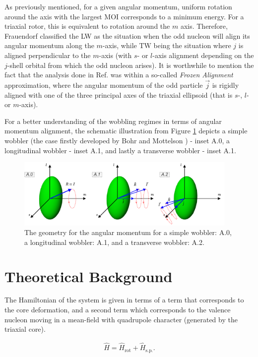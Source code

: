\documentclass[11pt]{article}
\begin{document}
As previously mentioned, for a given angular momentum, uniform rotation around the axis with the largest MOI corresponds to a minimum energy. For a triaxial rotor, this is equivalent to rotation around the $m$ axis. Therefore, Frauendorf \cite{frauendorf2014transverse} classified the LW as the situation when the odd nucleon will align its angular momentum along the $m$-axis, while TW being the situation where $j$ is aligned perpendicular to the $m$-axis (with $s$- or $l$-axis alignment depending on the $j$-shell orbital from which the odd nucleon arises). It is worthwhile to mention the fact that the analysis done in Ref. \cite{frauendorf2014transverse} was within a so-called \emph{Frozen Alignment} approximation, where the angular momentum of the odd particle $\vec{j}$ is rigidly aligned with one of the three principal axes of the triaxial ellipsoid (that is $s$-, $l$- or $m$-axis).

For a better understanding of the wobbling regimes in terms of angular momentum alignment, the schematic illustration from Figure \ref{wobbling-coupling-scheme} depicts a simple wobbler (the case firstly developed by Bohr and Mottelson \cite{bohr1998nuclear}) - inset A.0, a longitudinal wobbler - inset A.1, and lastly a transverse wobbler - inset A.1.

\begin{figure}
    \centering
    \includegraphics[width=0.95\textwidth]{figs/wobbling_Regimes_COUPLING_SCHEME.pdf}
    \caption{The geometry for the angular momentum for a simple wobbler: A.0, a longitudinal wobbler: A.1, and a transverse wobbler: A.2.}
    \label{wobbling-coupling-scheme}
\end{figure}


\section{Theoretical Background}

The Hamiltonian of the system is given in terms of a term that corresponds to the core deformation, and a second term which corresponds to the valence nucleon moving in a mean-field with quadrupole character (generated by the triaxial core).

\begin{align}
    \hat{H}=\hat{H}_\text{rot}+\hat{H}_\text{s.p.}.
\end{align}



\end{document}
